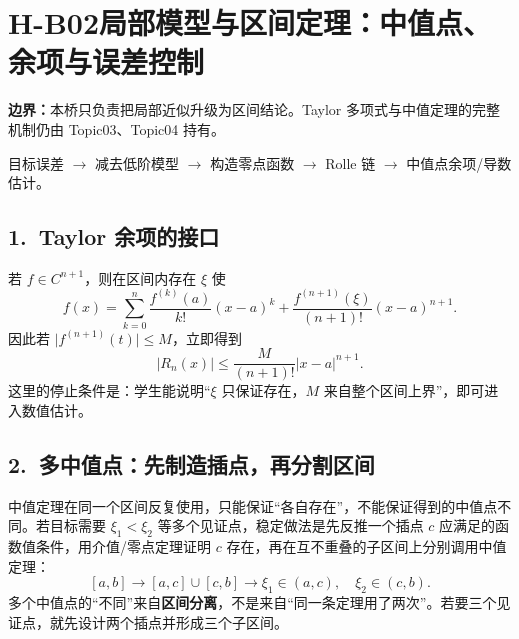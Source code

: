 \documentclass[UTF8,a4paper,10pt]{ctexart}
\begin{document}
\section*{H-B02\quad 局部模型与区间定理：中值点、余项与误差控制}
\textbf{边界：}本桥只负责把局部近似升级为区间结论。Taylor 多项式与中值定理的完整机制仍由 Topic03、Topic04 持有。
\begin{tcolorbox}[title=母接口]
目标误差 $\longrightarrow$ 减去低阶模型 $\longrightarrow$ 构造零点函数
$\longrightarrow$ Rolle 链 $\longrightarrow$ 中值点余项/导数估计。
\end{tcolorbox}
\begin{center}
\end{center}
\subsection*{1.\ Taylor 余项的接口}
若 $f\in C^{n+1}$，则在区间内存在 $\xi$ 使
\[
f(x)=\sum_{k=0}^{n}\frac{f^{(k)}(a)}{k!}(x-a)^k+
\frac{f^{(n+1)}(\xi)}{(n+1)!}(x-a)^{n+1}.
\]
因此若 $\lvert f^{(n+1)}(t)\rvert\le M$，立即得到
\[
\lvert R_n(x)\rvert\le \frac{M}{(n+1)!}\lvert x-a\rvert^{n+1}.
\]
这里的停止条件是：学生能说明“$\xi$ 只保证存在，$M$ 来自整个区间上界”，即可进入数值估计。
\subsection*{2.\ 多中值点：先制造插点，再分割区间}
中值定理在同一个区间反复使用，只能保证“各自存在”，不能保证得到的中值点不同。若目标需要 $\xi_1<\xi_2$ 等多个见证点，稳定做法是先反推一个插点 $c$ 应满足的函数值条件，用介值/零点定理证明 $c$ 存在，再在互不重叠的子区间上分别调用中值定理：
\[
[a,b]\longrightarrow [a,c]\cup[c,b]
\longrightarrow \xi_1\in(a,c),\quad \xi_2\in(c,b).
\]
多个中值点的“不同”来自\textbf{区间分离}，不是来自“同一条定理用了两次”。若要三个见证点，就先设计两个插点并形成三个子区间。
\end{document}
